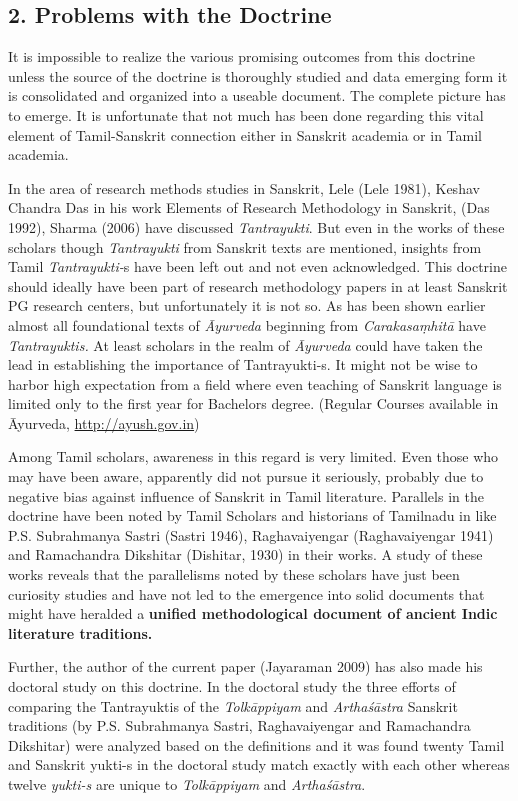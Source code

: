 \subsection*{2. Problems with the Doctrine}

It is impossible to realize the various promising outcomes from this doctrine unless the source of the doctrine is thoroughly studied and data emerging form it is consolidated and organized into a useable document. The complete picture has to emerge. It is unfortunate that not much has been done regarding this vital element of Tamil-Sanskrit connection either in Sanskrit academia or in Tamil academia.

In the area of research methods studies in Sanskrit, Lele (Lele 1981), Keshav Chandra Das in his work Elements of Research Methodology in Sanskrit, (Das 1992), Sharma (2006) have discussed \textit{Tantrayukti}. But even in the works of these scholars though \textit{Tantrayukti} from Sanskrit texts are mentioned, insights from Tamil \textit{Tantrayukti-}s have been left out and not even acknowledged. This doctrine should ideally have been part of research methodology papers in at least Sanskrit PG research centers, but unfortunately it is not so. As has been shown earlier almost all foundational texts of \textit{Āyurveda} beginning from \textit{Carakasaṃhitā} have \textit{Tantrayuktis.} At least scholars in the realm of \textit{Āyurveda} could have taken the lead in establishing the importance of Tantrayukti-s. It might not be wise to harbor high expectation from a field where even teaching of Sanskrit language is limited only to the first year for Bachelors degree. (Regular Courses available in Āyurveda, \url{http://ayush.gov.in})

Among Tamil scholars, awareness in this regard is very limited. Even those who may have been aware, apparently did not pursue it seriously, probably due to negative bias against influence of Sanskrit in Tamil literature. Parallels in the doctrine have been noted by Tamil Scholars and historians of Tamilnadu in like P.S. Subrahmanya Sastri (Sastri 1946), Raghavaiyengar (Raghavaiyengar 1941) and Ramachandra Dikshitar (Dishitar, 1930) in their works. A study of these works reveals that the parallelisms noted by these scholars have just been curiosity studies and have not led to the emergence into solid documents that might have heralded a \textbf{unified methodological document of ancient Indic literature traditions.}

Further, the author of the current paper (Jayaraman 2009) has also made his doctoral study on this doctrine. In the doctoral study the three efforts of comparing the Tantrayuktis of the \textit{Tolkāppiyam} and \textit{Arthaśāstra} Sanskrit traditions (by P.S. Subrahmanya Sastri, Raghavaiyengar and Ramachandra Dikshitar) were analyzed based on the definitions and it was found twenty Tamil and Sanskrit yukti-s in the doctoral study match exactly with each other whereas twelve \textit{yukti-s} are unique to \textit{Tolkāppiyam} and \textit{Arthaśāstra}.

